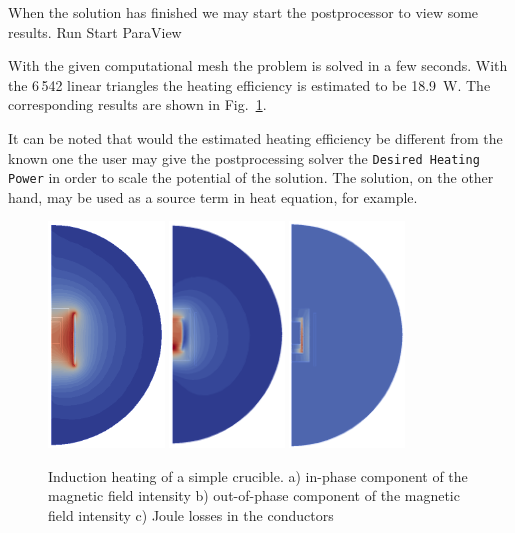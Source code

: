 When the solution has finished we may start the postprocessor to view some results.
\ttbegin
Run
  Start ParaView
\ttend


With the given computational mesh the problem is solved in 
a few seconds. With the 6\,542 linear triangles the heating
efficiency is estimated to be 18.9~W. The corresponding results are shown
in Fig.~\ref{fig:ind_heat1}.

It can be noted that would the estimated heating efficiency be different from the known one
the user may give the postprocessing solver the \texttt{Desired Heating Power} in order to scale 
the potential of the solution. The solution, on the other hand, may be used as a source term 
in heat equation, for example. 

\begin{figure}
\begin{center}
  \includegraphics[height=60mm]{Induction_B_re}
  \includegraphics[height=60mm]{Induction_B_im}
  \includegraphics[height=60mm]{Induction_Joule_heating}


\end{center}
\caption{Induction heating of a simple crucible. 
a) in-phase component of the magnetic field intensity
b) out-of-phase component of the magnetic field intensity
c) Joule losses in the conductors}
\label{fig:ind_heat1}
\end{figure}

